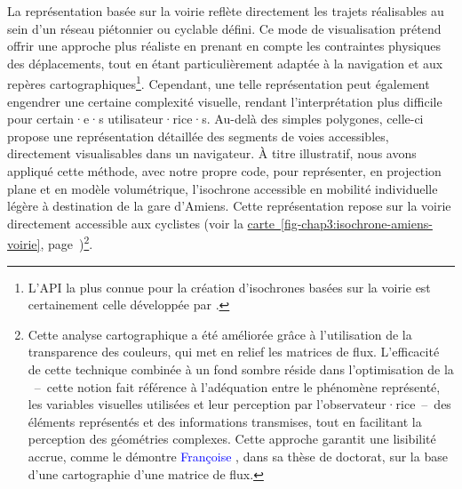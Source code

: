 \begin{refsegment}
La représentation basée sur la voirie reflète directement les trajets réalisables au sein d’un réseau piétonnier ou cyclable défini. Ce mode de visualisation prétend offrir une approche plus réaliste en prenant en compte les contraintes physiques des déplacements, tout en étant particulièrement adaptée à la navigation et aux repères cartographiques\footnote{
    L'\acrfull{API} la plus connue pour la création d’isochrones basées sur la voirie est certainement celle développée par \textcolor{blue}{\textcite{graphhopper_visualization_2018}}.
}. Cependant, une telle représentation peut également engendrer une certaine complexité visuelle, rendant l’interprétation plus difficile pour certain·e·s utilisateur·rice·s. Au-delà des simples polygones, celle-ci propose une représentation détaillée des segments de voies accessibles, directement visualisables dans un navigateur. À titre illustratif, nous avons appliqué cette méthode, avec notre propre code, pour représenter, en projection plane et en modèle volumétrique, l’isochrone accessible en mobilité individuelle légère à destination de la gare d’Amiens. Cette représentation repose sur la voirie directement accessible aux cyclistes (voir la \hyperref[fig-chap3:isochrone-amiens-voirie]{carte~\ref{fig-chap3:isochrone-amiens-voirie}}, page~\pageref{fig-chap3:isochrone-amiens-voirie})\footnote{
    Cette analyse cartographique a été améliorée grâce à l’utilisation de la transparence des couleurs, qui met en relief les matrices de flux. L’efficacité de cette technique combinée à un fond sombre réside dans l’optimisation de la ~–~cette notion fait référence à l’adéquation entre le phénomène représenté, les variables visuelles utilisées et leur perception par l’observateur·rice~–~des éléments représentés et des informations transmises, tout en facilitant la perception des géométries complexes. Cette approche garantit une lisibilité accrue, comme le démontre \textcolor{blue}{Françoise} \textcolor{blue}{\textcite[226]{bahoken_contribution_2016}}, dans sa thèse de doctorat, sur la base d'une cartographie d’une matrice de flux.
}.%


\end{refsegment}
